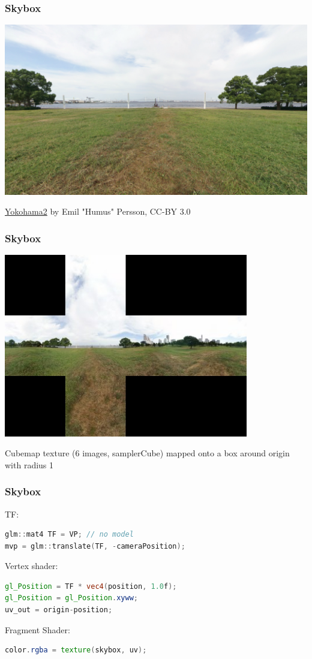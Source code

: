 \documentclass[12pt]{beamer}
\begin{document}
    \begin{frame}
        \frametitle{Skybox}
        \includegraphics[width=\textwidth]{skybox}

        \href{https://humus.name/index.php?page=Textures&ID=138}{Yokohama2}
        by Emil "Humus" Persson, CC-BY 3.0
    \end{frame}
    \begin{frame}
        \frametitle{Skybox}
        \includegraphics[width=0.8\textwidth]{yokohama2}

        Cubemap texture (6 images, samplerCube) mapped onto a box around origin with radius 1
    \end{frame}
    \begin{frame}[fragile]
        \frametitle{Skybox}
        TF:
        \begin{lstlisting}[language=C++, label={lst:skyboxmvp}]
glm::mat4 TF = VP; // no model
mvp = glm::translate(TF, -cameraPosition);
        \end{lstlisting}
        Vertex shader:
        \begin{lstlisting}[language=glsl,label={lst:skyboxvert}]
gl_Position = TF * vec4(position, 1.0f);
gl_Position = gl_Position.xyww;
uv_out = origin-position;
        \end{lstlisting}
        Fragment Shader:
        \begin{lstlisting}[language=glsl,label={lst:skyboxfrag}]
color.rgba = texture(skybox, uv);
        \end{lstlisting}
    \end{frame}
\end{document}
